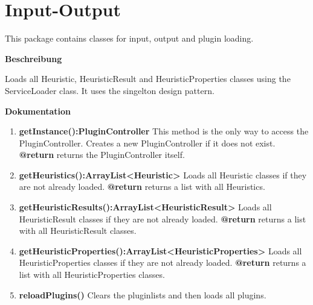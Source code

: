 	\section{Input-Output}

This package contains classes for input, output and plugin loading.


\textbf{Beschreibung}

Loads all Heuristic, HeuristicResult and HeuristicProperties classes using the ServiceLoader class. It uses the singelton design pattern.

\textbf{Dokumentation}
\begin{enumerate}[+]
	\item{
		\textbf{getInstance():PluginController} \newline
		This method is the only way to access the PluginController. Creates a new PluginController if it does not exist. \newline
		\textbf{@return} returns the PluginController itself. \newline
	}
	\item{
		\textbf{getHeuristics():ArrayList<Heuristic> } \newline
		Loads all Heuristic classes if they are not already loaded. \newline
		\textbf{@return} returns a list with all Heuristics. \newline
	}
	\item{
		\textbf{getHeuristicResults():ArrayList<HeuristicResult>} \newline
		Loads all HeuristicResult classes if they are not already loaded. \newline
		\textbf{@return} returns a list with all HeuristicResult classes. \newline
	}
	\item{
		\textbf{getHeuristicProperties():ArrayList<HeuristicProperties>} \newline
		Loads all HeuristicProperties classes if they are not already loaded. \newline
		\textbf{@return} returns a list with all HeuristicProperties classes. \newline
	}
	\item{
		\textbf{reloadPlugins()} \newline
		Clears the pluginlists and then loads all plugins. \newline
	}
\end{enumerate}

